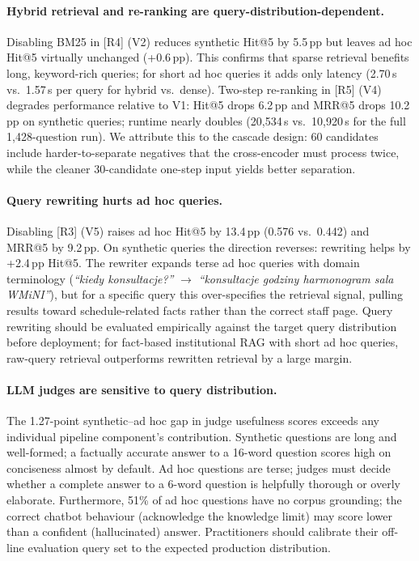 \documentclass[sigconf,natbib=true]{acmart}
\begin{document}
\paragraph{Hybrid retrieval and re-ranking are query-distribution-dependent.}
Disabling BM25 in [R4] (V2) reduces synthetic Hit@5 by 5.5\,pp but leaves ad hoc Hit@5 virtually unchanged (+0.6\,pp).
This confirms that sparse retrieval benefits long, keyword-rich queries; for short ad hoc queries it adds only latency (2.70\,s vs.\ 1.57\,s per query for hybrid vs.\ dense).
Two-step re-ranking in [R5] (V4) degrades performance relative to V1: Hit@5 drops 6.2\,pp and MRR@5 drops 10.2\,pp on synthetic queries; runtime nearly doubles (20{,}534\,s vs.\ 10{,}920\,s for the full 1{,}428-question run).
We attribute this to the cascade design: 60 candidates include harder-to-separate negatives that the cross-encoder must process twice, while the cleaner 30-candidate one-step input yields better separation.

\paragraph{Query rewriting hurts ad hoc queries.}
Disabling [R3] (V5) raises ad hoc Hit@5 by 13.4\,pp (0.576 vs.\ 0.442) and MRR@5 by 9.2\,pp.
On synthetic queries the direction reverses: rewriting helps by +2.4\,pp Hit@5.
The rewriter expands terse ad hoc queries with domain terminology (\textit{``kiedy konsultacje?''} $\to$ \textit{``konsultacje godziny harmonogram sala WMiNI''}), but for a specific query this over-specifies the retrieval signal, pulling results toward schedule-related facts rather than the correct staff page.
Query rewriting should be evaluated empirically against the target query distribution before deployment; for fact-based institutional RAG with short ad hoc queries, raw-query retrieval outperforms rewritten retrieval by a large margin.

\paragraph{LLM judges are sensitive to query distribution.}
The 1.27-point synthetic--ad hoc gap in judge usefulness scores exceeds any individual pipeline component's contribution.
Synthetic questions are long and well-formed; a factually accurate answer to a 16-word question scores high on conciseness almost by default.
Ad hoc questions are terse; judges must decide whether a complete answer to a 6-word question is helpfully thorough or overly elaborate.
Furthermore, 51\% of ad hoc questions have no corpus grounding; the correct chatbot behaviour (acknowledge the knowledge limit) may score lower than a confident (hallucinated) answer.
Practitioners should calibrate their off-line evaluation query set to the expected production distribution.
\end{document}
